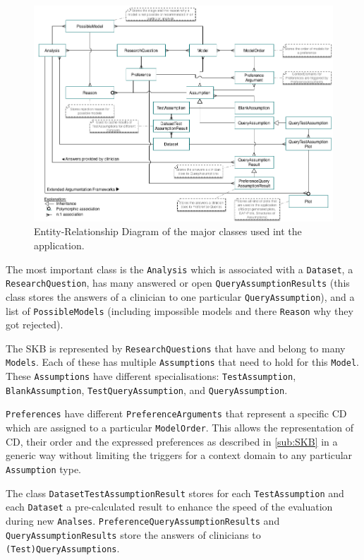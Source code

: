 \begin{figure}[h!]
	\centering
	\includegraphics[width=\textwidth]{figures/er_complete}
	\caption{Entity-Relationship Diagram of the major classes used int the application. }
	\label{fig:er}
\end{figure}


The most important class is the \texttt{Analysis} which is associated with a \texttt{Dataset}, a \texttt{ResearchQuestion}, has many answered or open \texttt{QueryAssumptionResults} (this class stores the answers of a clinician to one particular \texttt{QueryAssumption}), and a list of \texttt{PossibleModels} (including impossible models and there \texttt{Reason} why they got rejected). 

The \gls{SKB} is represented by \texttt{ResearchQuestions} that have and belong to many \texttt{Models}. Each of these has multiple \texttt{Assumptions} that need to hold for this \texttt{Model}. These \texttt{Assumptions} have different specialisations: \texttt{TestAssumption}, \texttt{BlankAssumption}, \texttt{TestQueryAssumption}, and \texttt{QueryAssumption}. 

\texttt{Preferences} have different \texttt{PreferenceArguments} that represent a specific \gls{CD} which are assigned to a particular \texttt{ModelOrder}. This allows the representation of \gls{CD}, their order and the expressed preferences as described in \autoref{sub:SKB} in a generic way without limiting the triggers for a context domain to any particular \texttt{Assumption} type. 

The class \texttt{DatasetTestAssumptionResult} stores for each \texttt{TestAssumption} and each \texttt{Dataset} a pre-calculated result to enhance the speed of the evaluation during new \texttt{Analses}. \texttt{PreferenceQueryAssumptionResults} and \texttt{QueryAssumptionResults} store the answers of clinicians to \texttt{(Test)QueryAssumptions}.


